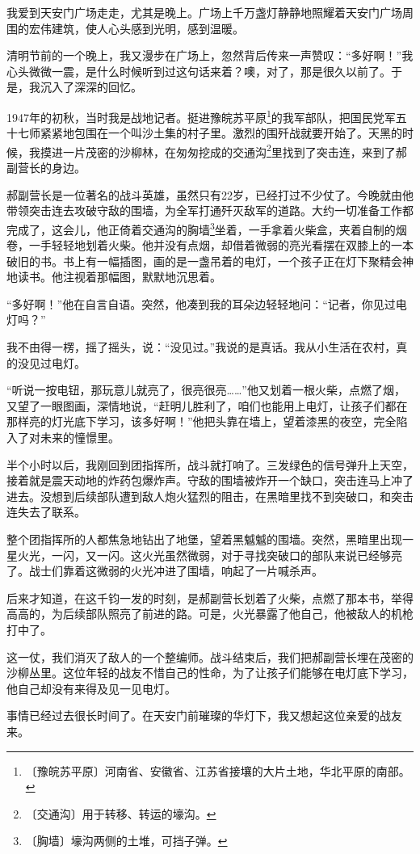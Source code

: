 \documentclass[12pt,UTF-8,openany]{ctexbook}
\begin{document}
\begin{large}
    
    我爱到天安门广场走走，尤其是晚上。广场上千万盏灯静静地照耀着天安门广场周围的宏伟建筑，使人心头感到光明，感到温暖。
    
    清明节前的一个晚上，我又漫步在广场上，忽然背后传来一声赞叹：“多好啊！”我心头微微一震，是什么时候听到过这句话来着？噢，对了，那是很久以前了。于是，我沉入了深深的回忆。
    
    1947年的初秋，当时我是战地记者。挺进豫皖苏平原\footnote{〔豫皖苏平原〕河南省、安徽省、江苏省接壤的大片土地，华北平原的南部。}的我军部队，把国民党军五十七师紧紧地包围在一个叫沙土集的村子里。激烈的围歼战就要开始了。天黑的时候，我摸进一片茂密的沙柳林，在匆匆挖成的交通沟\footnote{〔交通沟〕用于转移、转运的壕沟。}里找到了突击连，来到了郝副营长的身边。
    
    郝副营长是一位著名的战斗英雄，虽然只有22岁，已经打过不少仗了。今晚就由他带领突击连去攻破守敌的围墙，为全军打通歼灭敌军的道路。大约一切准备工作都完成了，这会儿，他正倚着交通沟的胸墙\footnote{〔胸墙〕壕沟两侧的土堆，可挡子弹。}坐着，一手拿着火柴盒，夹着自制的烟卷，一手轻轻地划着火柴。他并没有点烟，却借着微弱的亮光看摆在双膝上的一本破旧的书。书上有一幅插图，画的是一盏吊着的电灯，一个孩子正在灯下聚精会神地读书。他注视着那幅图，默默地沉思着。
    
    “多好啊！”他在自言自语。突然，他凑到我的耳朵边轻轻地问：“记者，你见过电灯吗？”
    
    我不由得一楞，摇了摇头，说：“没见过。”我说的是真话。我从小生活在农村，真的没见过电灯。
    
    “听说一按电钮，那玩意儿就亮了，很亮很亮……”他又划着一根火柴，点燃了烟，又望了一眼图画，深情地说，“赶明儿胜利了，咱们也能用上电灯，让孩子们都在那样亮的灯光底下学习，该多好啊！”他把头靠在墙上，望着漆黑的夜空，完全陷入了对未来的憧憬里。
    
    半个小时以后，我刚回到团指挥所，战斗就打响了。三发绿色的信号弹升上天空，接着就是震天动地的炸药包爆炸声。守敌的围墙被炸开一个缺口，突击连马上冲了进去。没想到后续部队遭到敌人炮火猛烈的阻击，在黑暗里找不到突破口，和突击连失去了联系。
    
    整个团指挥所的人都焦急地钻出了地堡，望着黑魆魆的围墙。突然，黑暗里出现一星火光，一闪，又一闪。这火光虽然微弱，对于寻找突破口的部队来说已经够亮了。战士们靠着这微弱的火光冲进了围墙，响起了一片喊杀声。
    
    后来才知道，在这千钧一发的时刻，是郝副营长划着了火柴，点燃了那本书，举得高高的，为后续部队照亮了前进的路。可是，火光暴露了他自己，他被敌人的机枪打中了。
    
    这一仗，我们消灭了敌人的一个整编师。战斗结束后，我们把郝副营长埋在茂密的沙柳丛里。这位年轻的战友不惜自己的性命，为了让孩子们能够在电灯底下学习，他自己却没有来得及见一见电灯。
    
    事情已经过去很长时间了。在天安门前璀璨的华灯下，我又想起这位亲爱的战友来。
    
\end{large}
\end{document}
